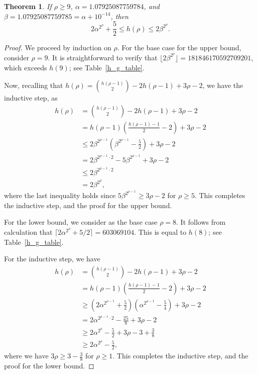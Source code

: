 \documentclass[12pt]{article}
\newtheorem{theorem}{Theorem}[section]
\theoremstyle{definition}
\numberwithin{table}{section}
\newcommand{\round}{{\rho}}
\begin{document}
\begin{theorem}
If $\round \geq 9$, $\alpha = 1.07925087759784$, and 
$\beta = 1.07925087759785 = \alpha+10^{-14}$, then
    $$2 \alpha^{2^{\round}}+\frac{5}{2} \leq h(\round) \leq 2\beta^{2^{\round}}.$$
\label{Size of h(r)}
\end{theorem}
\begin{proof}
We proceed by induction on $\round$.  
For the base case for the upper bound, consider $\round=9$.  It is straightforward to verify that $\lfloor 2 \beta^{2^\round}\rfloor =181846170592709201$, which exceeds $h(9)$; see Table~\ref{h_g_table}. 

Now, recalling that $h(\round)=\binom{h(\round-1)}{2}-2h(\round-1)+3\round-2$, we have the inductive step, as 
\begin{align*}
h(\round) &= \binom{h(\round-1)}{2} -2h(\round-1)+3\round-2 \\
     &= h(\round-1)\left( \frac{h(\round-1)-1}{2} - 2 \right) +3\round-2 \\
     &\leq 2\beta^{2^{\round-1}} \left( \beta^{2^{\round-1}} - \frac{5}{2}\right)+3\round-2\\
     &= 2\beta^{2^{\round-1}\cdot 2} - 5 \beta^{2^{\round-1}} +3\round-2\\
     & \leq 2\beta^{2^{\round-1}\cdot 2}\\
     & = 2\beta^{2^{\round}},
\end{align*}
where the last inequality holds since $5 \beta^{2^{\round-1}} \geq 3\round-2$ for $\round \geq 5$. This completes the inductive step, and the proof for the upper bound. 

For the lower bound, we consider as the base case $\round=8$. It follows from calculation that $\lceil 2 \alpha^{2^\round}+5/2\rceil = 603069104$. 
This is equal to $h(8)$; see Table~\ref{h_g_table}. 


For the inductive step, we have 
\begin{align*}
h(\round) &=\binom{h(\round-1)}{2} -2h(\round-1)+3\round-2 \\
     &= h(\round-1)\left( \frac{h(\round-1)-1}{2} - 2 \right) +3\round-2 \\
     &\geq \left( 2 \alpha^{2^{\round-1}} +\frac{5}{2} \right)\left( \alpha^{2^{\round-1}}-\frac{5}{4}\right)+3\round-2\\
     &= 2 \alpha^{2^{\round-1}\cdot 2} - \frac{25}{8} +3\round-2\\
     & \geq 2 \alpha^{2^{\round}}- \frac{5}{2}+3\round-3+\frac{3}{8}\\
     & \geq 2 \alpha^{2^{\round}}-\frac{5}{2},
\end{align*}
where we have $3\round\geq 3-\frac{3}{8}$ for $\round \geq 1$. 
This completes the inductive step, and the proof for the lower bound.
\end{proof}
\end{document}
